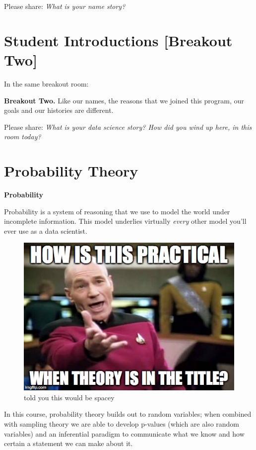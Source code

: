 \documentclass[
]{book}
\theoremstyle{definition}
\theoremstyle{definition}
\theoremstyle{definition}
\theoremstyle{definition}
\theoremstyle{remark}
\begin{document}
Please share: \emph{What is your name story?}

\hypertarget{student-introductions-breakout-two}{%
\section{Student Introductions {[}Breakout Two{]}}\label{student-introductions-breakout-two}}

In the same breakout room:

\textbf{Breakout Two.}
Like our names, the reasons that we joined this program, our goals and our histories are different.

Please share: \emph{What is your data science story? How did you wind up here, in this room today?}

\hypertarget{probability-theory}{%
\section{Probability Theory}\label{probability-theory}}

\textbf{Probability}

Probability is a system of reasoning that we use to model the world under incomplete information. This model underlies virtually \emph{every} other model you'll ever use as a data scientist.

\begin{figure}
\centering
\includegraphics{./images/picard.jpg}
\caption{told you this would be spacey}
\end{figure}

In this course, probability theory builds out to random variables; when combined with sampling theory we are able to develop p-values (which are also random variables) and an inferential paradigm to communicate what we know and how certain a statement we can make about it.
\end{document}
